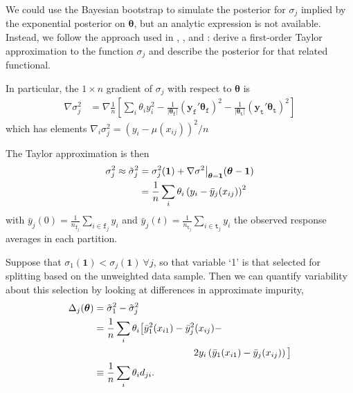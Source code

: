\documentclass{article}
\begin{document}
We could use the Bayesian bootstrap to simulate the posterior for $\sigma_j$ implied by the exponential
posterior on $\boldsymbol{\theta}$, but an  analytic
expression is not available. Instead, we follow the approach used in
\citet{lancaster_note_2003}, \citet{poirier_bayesian_2011}, and
\citet{taddy_heterogeneous_2014}:  derive a first-order Taylor
approximation to the function $\sigma_j$ and describe the posterior for
that related functional. 

In particular, the $1\times n$ gradient of
$\sigma_j$ with respect to $\boldsymbol{\theta}$ is
\begin{align}
\nabla \sigma^2_j & = \nabla  \frac{1}{n}\left[\sum_i \theta_iy_i^2 - \frac{1}{\left|\boldsymbol{\theta}_{\texttt{f}}\right|}\left(\mathbf{y}_{\texttt{f}}'\boldsymbol{\theta}_{\texttt{f}}\right)^2
- \frac{1}{\left|\boldsymbol{\theta}_{\texttt{t}}\right|}\left(\mathbf{y}_{\texttt{t}}'\boldsymbol{\theta}_{\texttt{t}}\right)^2\right]
\end{align}
which has elements $ \nabla_{i} \sigma^2_j = \left(y_i -
\mu(x_{ij})\right)^2/n $

The Taylor approximation is then 
\begin{align}
\sigma^2_j \approx \tilde\sigma^2_j  &= \sigma^2_j(\boldsymbol{1}) + \nabla \sigma^2\big |_{\boldsymbol{\theta}=\mathbf{1}} (\boldsymbol{\theta} - \boldsymbol{1}) \notag\\ &=  \frac{1}{n}\sum_i \theta_i \left(y_i - \bar{y}_j(x_{ij})\right)^2
\end{align} with
$\bar y_j(0) = \frac{1}{n_{\texttt{f}_j}}\sum_{i \in \texttt{f}_j}y_i$
and
$\bar y_j(t) = \frac{1}{n_{\texttt{t}_j}}\sum_{i \in \texttt{t}_j}y_i$
 the observed response averages in each partition.

    Suppose that
$\sigma_1(\boldsymbol{1}) < \sigma_j(\boldsymbol{1})~\forall j$, so that
variable `1' is that selected for splitting based on the unweighted data sample. Then we can
quantify variability about this selection by looking at differences
in approximate impurity,
\begin{align}
\Delta_j(\boldsymbol{\theta})  & = \tilde\sigma_1^2 - \tilde\sigma_j^2 
\\ & =    \frac{1}{n}\sum_i \theta_i
\big[
\bar{y}_1^2(x_{i1})-\bar{y}^2_j(x_{ij}) - \notag\\ &~~~~~~~~~~~~~~~~~~~~~~~~~~~~~~~
2y_i\left(\bar{y}_1(x_{i1})-\bar{y}_j(x_{ij})\right)\big] \notag
\\ & \equiv \frac{1}{n}\sum_i \theta_i d_{ji}. \notag
\end{align}
\end{document}
